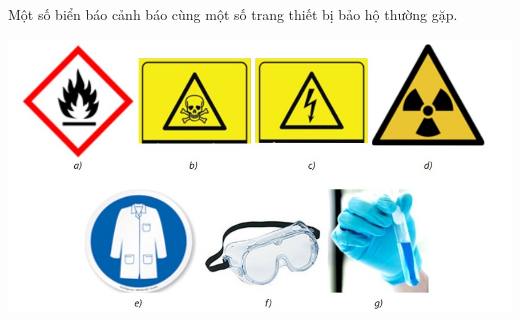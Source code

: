 Một số biển báo cảnh báo cùng một số trang thiết bị bảo hộ thường gặp.
\begin{center}
	\includegraphics[width=0.8\linewidth]{figs/BAI2-2}
\end{center}
